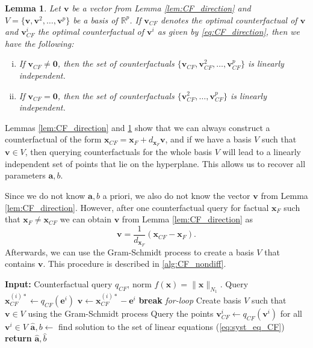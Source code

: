 \documentclass{article}
\newtheorem{lemma}[theorem]{Lemma}
\begin{document}
\begin{lemma}\label{lem:CF_basis}
    Let $\bm{v}$ be a vector from Lemma \ref{lem:CF_direction} and $V=\{\bm{v},\bm{v}^{2},\ldots, \bm{v}^{p}\}$ be a basis of $\mathbb{R}^p$. If $\bm{v}_{CF}$ denotes the optimal counterfactual of $\bm{v}$ and $\bm{v}^{i}_{CF}$ the optimal counterfactual of $\bm{v}^{i}$ as given by \eqref{eq:CF_direction}, then we have the following:
    \begin{enumerate}[(i)]
        \item If $\bm{v}_{CF}\neq\bm{0}$, then the set of counterfactuals $\{\bm{v}_{CF},\bm{v}_{CF}^{2},\ldots, \bm{v}_{CF}^{p}\}$ is linearly independent.
        \item If $\bm{v}_{CF}=\bm{0}$, then the set  of counterfactuals $\{\bm{v}_{CF}^{2},\ldots, \bm{v}_{CF}^{p}\}$ is linearly independent.
    \end{enumerate}
\end{lemma}

Lemmas \ref{lem:CF_direction} and \ref{lem:CF_basis} show that we can always construct a counterfactual of the form $\bm{x}_{CF} = \bm{x}_F + d_{\bm{x}_F}\bm{v}$, and if we have a basis $V$ such that $\bm{v}\in V$, then querying counterfactuals for the whole basis $V$ will lead to a linearly independent set of points that lie on the hyperplane. This allows us to recover all parameters $\bm{a},b$.

Since we do not know $\bm{a},b$ a priori, we also do not know the vector $\bm{v}$ from Lemma \ref{lem:CF_direction}. However, after one counterfactual query for factual $\bm{x}_F$ such that $\bm{x}_F\neq \bm{x}_{CF}$ we can obtain $\bm{v}$ from Lemma \ref{lem:CF_direction} as
\[
\bm{v} = \frac{1}{d_{\bm{x}_F}}\left( \bm{x}_{CF} - \bm{x}_F\right).
\]
Afterwards, we can use the Gram-Schmidt process to create a basis $V$ that contains $\bm{v}$. This procedure is described in \cref{alg:CF_nondiff}.

\begin{algorithm}[H]
\caption{Extracting $\hat{\bm{a}},\hat{b}$ using counterfactuals with non-differentiable norm $\| \cdot \|_{N_1}$}\label{alg:CF_nondiff}
\begin{algorithmic}
\State \textbf{Input:} Counterfactual query $q_{CF}$, norm $f(\bm{x})=\| \bm{x}\|_{N_1}$.
\State Query $\bm{x}_{CF}^{(i)*} \leftarrow q_{CF}(\bm{e}^{i})$
\State $\bm{v} \gets \bm{x}_{CF}^{(i)*} -\bm{e}^{i}$
\State \textbf{break} \textit{for-loop}
\EndIf
\EndFor
\State Create basis $V$ such that $\bm{v}\in V$ using the Gram-Schmidt process
\State Query the points $\bm{v}_{CF}^{i} \leftarrow q_{CF}(\bm{v}^{i})$ for all $\bm{v}^{i}\in V$
\State $\hat{\bm{a}},b \gets$ find solution to the set of linear equations (\ref{eq:syst_eq_CF})
\State \textbf{return} $\hat{\bm{a}},\hat b$
\end{algorithmic}
\end{algorithm}
\end{document}
